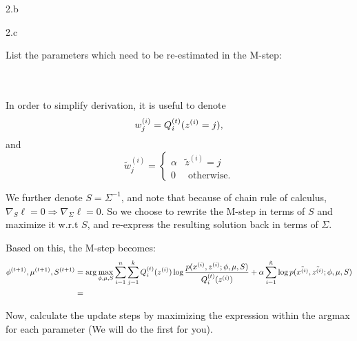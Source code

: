\LARGE
2.b
\normalsize

  \begin{answer}
  \end{answer}
\clearpage

\LARGE
2.c
\normalsize

  \begin{answer}
    List the parameters which need to be re-estimated in the M-step:\\\\\\

    \allowdisplaybreaks

    In order to simplify derivation, it is useful to denote $$w_j^{(i)} = Q^{(t)}_i(z^{(i)}=j),$$ and $$\tilde{w}_j^{(i)} = \begin{cases} \alpha & \tilde{z}^{(i)} = j \\ 0 & \text{ otherwise.} \end{cases}$$

    We further denote $S = \Sigma^{-1}$, and note that because of chain rule of calculus, $\nabla_S\ell = 0 \Rightarrow \nabla_\Sigma \ell = 0$. So we choose to rewrite the M-step in terms of $S$ and maximize it w.r.t $S$, and re-express the resulting solution back in terms of $\Sigma$.

    Based on this, the M-step becomes:
    \begin{align*}
    \phi^{(t+1)}, \mu^{(t+1)}, S^{(t+1)} &=  \arg\max_{\phi,\mu,S} \sum_{i=1}^{n} \sum_{j=1}^k Q_i^{(t)}(z^{(i)}) \log \frac{p(x^{(i)},z^{(i)};\phi,\mu,S)}{Q_i^{(t)}(z^{(i)})} + \alpha \sum_{i=1}^{\tilde{{n}}} \log p(\tilde{x^{(i)}}, \tilde{z^{(i)}}; \phi, \mu, S)\\
    &=\\
    \end{align*}

    Now, calculate the update steps by maximizing the expression within the argmax for each parameter (We will do the first for you).


\end{answer}

